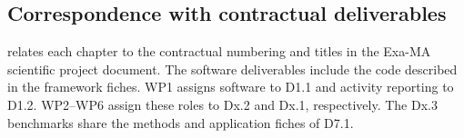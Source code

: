 \subsection{Correspondence with contractual deliverables}
\label{sec:deliverable-correspondence}

 relates each chapter to the
contractual numbering and titles in the Exa-MA scientific project
document. The software deliverables include the code described in
the framework fiches. WP1 assigns software to D1.1 and activity
reporting to D1.2. WP2--WP6 assign these roles to Dx.2 and Dx.1,
respectively. The Dx.3 benchmarks share the methods and application
fiches of D7.1.

\begingroup
\small
\setlength{\tabcolsep}{4pt}
